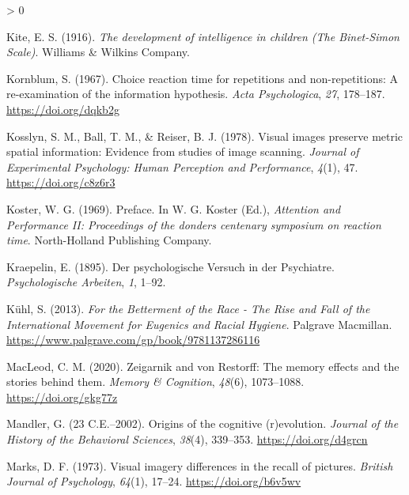 \documentclass[
  oneside,
  12pt]{crumpbook}
\newlength{\cslhangindent}
\newenvironment{CSLReferences}[2] %
 {%
  \setlength{\parindent}{0pt}
  \ifodd #1 \everypar{\setlength{\hangindent}{\cslhangindent}}\ignorespaces\fi
  \ifnum #2 > 0
  \setlength{\parskip}{#2\baselineskip}
  \fi
 }%
 {}
\begin{document}
\begin{CSLReferences}{1}{0}
\leavevmode\hypertarget{ref-kiteDevelopmentIntelligenceChildren1916}{}%
Kite, E. S. (1916). \emph{The development of intelligence in children ({The Binet}-{Simon Scale})}. {Williams \& Wilkins Company}.

\leavevmode\hypertarget{ref-kornblumChoiceReactionTime1967}{}%
Kornblum, S. (1967). Choice reaction time for repetitions and non-repetitions: {A} re-examination of the information hypothesis. \emph{Acta Psychologica}, \emph{27}, 178--187. \url{https://doi.org/dqkb2g}

\leavevmode\hypertarget{ref-kosslynVisualImagesPreserve1978}{}%
Kosslyn, S. M., Ball, T. M., \& Reiser, B. J. (1978). Visual images preserve metric spatial information: Evidence from studies of image scanning. \emph{Journal of Experimental Psychology: Human Perception and Performance}, \emph{4}(1), 47. \url{https://doi.org/c8z6r3}

\leavevmode\hypertarget{ref-kosterPreface1969}{}%
Koster, W. G. (1969). Preface. In W. G. Koster (Ed.), \emph{Attention and {Performance II}: Proceedings of the donders centenary symposium on reaction time}. {North-Holland Publishing Company}.

\leavevmode\hypertarget{ref-kraepelinPsychologischeVersuchPsychiatre1895}{}%
Kraepelin, E. (1895). Der psychologische {Versuch} in der {Psychiatre}. \emph{Psychologische Arbeiten}, \emph{1}, 1--92.

\leavevmode\hypertarget{ref-kuhlBettermentRaceRise2013}{}%
Kühl, S. (2013). \emph{For the {Betterment} of the {Race} - {The Rise} and {Fall} of the {International Movement} for {Eugenics} and {Racial Hygiene}}. {Palgrave Macmillan}. \url{https://www.palgrave.com/gp/book/9781137286116}

\leavevmode\hypertarget{ref-macleodZeigarnikRestorffMemory2020}{}%
MacLeod, C. M. (2020). Zeigarnik and von {Restorff}: {The} memory effects and the stories behind them. \emph{Memory \& Cognition}, \emph{48}(6), 1073--1088. \url{https://doi.org/gkg77z}

\leavevmode\hypertarget{ref-mandlerOriginsCognitiveEvolution23}{}%
Mandler, G. (23 C.E.--2002). Origins of the cognitive (r)evolution. \emph{Journal of the History of the Behavioral Sciences}, \emph{38}(4), 339--353. \url{https://doi.org/d4grcn}

\leavevmode\hypertarget{ref-marksVisualImageryDifferences1973}{}%
Marks, D. F. (1973). Visual imagery differences in the recall of pictures. \emph{British Journal of Psychology}, \emph{64}(1), 17--24. \url{https://doi.org/b6v5wv}


\end{CSLReferences}
\end{document}

